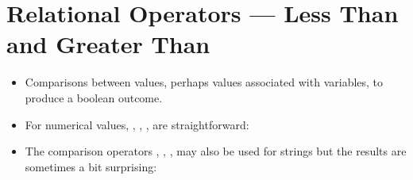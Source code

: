 \documentclass[letterpaper,10pt,english]{sphinxmanual}
\begin{document}
\section{Relational Operators — Less Than and Greater Than}
\label{\detokenize{lecture_notes/lec06_conditionals1:relational-operators-less-than-and-greater-than}}\begin{itemize}
\item {} 
Comparisons between values, perhaps values associated with variables,
to produce a boolean outcome.

\item {} 
For numerical values, \sphinxcode{\sphinxupquote{\textless{}}}, \sphinxcode{\sphinxupquote{\textless{}=}}, \sphinxcode{\sphinxupquote{\textgreater{}}}, \sphinxcode{\sphinxupquote{\textgreater{}=}} are
straightforward:

%
\begin{sphinxVerbatim}[commandchars=\\\{\}]
  
  
  
  
  
  
\end{sphinxVerbatim}

\item {} 
The comparison operators \sphinxcode{\sphinxupquote{\textless{}}}, \sphinxcode{\sphinxupquote{\textless{}=}}, \sphinxcode{\sphinxupquote{\textgreater{}}},
\sphinxcode{\sphinxupquote{\textgreater{}=}} may also be used for strings but the results are sometimes a
bit surprising:

%
\begin{sphinxVerbatim}[commandchars=\\\{\}]
  
  
  
  
  
  
  
  
\end{sphinxVerbatim}


\end{itemize}
\end{document}
